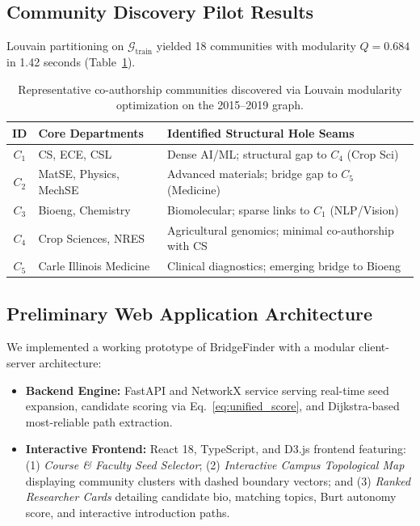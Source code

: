 \subsection{Community Discovery Pilot Results}
Louvain partitioning on $\mathcal{G}_{\text{train}}$ yielded 18 communities with modularity $Q = 0.684$ in 1.42 seconds (Table~\ref{tab:communities}).

\begin{table}[h]
\centering
\small
\caption{Representative co-authorship communities discovered via Louvain modularity optimization on the 2015--2019 graph.}
\label{tab:communities}
\begin{tabularx}{\columnwidth}{clX}
\toprule
\textbf{ID} & \textbf{Core Departments} & \textbf{Identified Structural Hole Seams} \\
\midrule
$C_1$ & CS, ECE, CSL & Dense AI/ML; structural gap to $C_4$ (Crop Sci) \\
$C_2$ & MatSE, Physics, MechSE & Advanced materials; bridge gap to $C_5$ (Medicine) \\
$C_3$ & Bioeng, Chemistry & Biomolecular; sparse links to $C_1$ (NLP/Vision) \\
$C_4$ & Crop Sciences, NRES & Agricultural genomics; minimal co-authorship with CS \\
$C_5$ & Carle Illinois Medicine & Clinical diagnostics; emerging bridge to Bioeng \\
\bottomrule
\end{tabularx}
\vspace{-3pt}
\end{table}

\subsection{Preliminary Web Application Architecture}
We implemented a working prototype of BridgeFinder with a modular client-server architecture:
\begin{itemize}
    \setlength{\itemsep}{0.2pt}\setlength{\parskip}{0pt}
    \item \textbf{Backend Engine:} FastAPI and NetworkX service serving real-time seed expansion, candidate scoring via Eq.~\eqref{eq:unified_score}, and Dijkstra-based most-reliable path extraction.
    \item \textbf{Interactive Frontend:} React 18, TypeScript, and D3.js frontend featuring: (1) \emph{Course \& Faculty Seed Selector}; (2) \emph{Interactive Campus Topological Map} displaying community clusters with dashed boundary vectors; and (3) \emph{Ranked Researcher Cards} detailing candidate bio, matching topics, Burt autonomy score, and interactive introduction paths.
\end{itemize}

